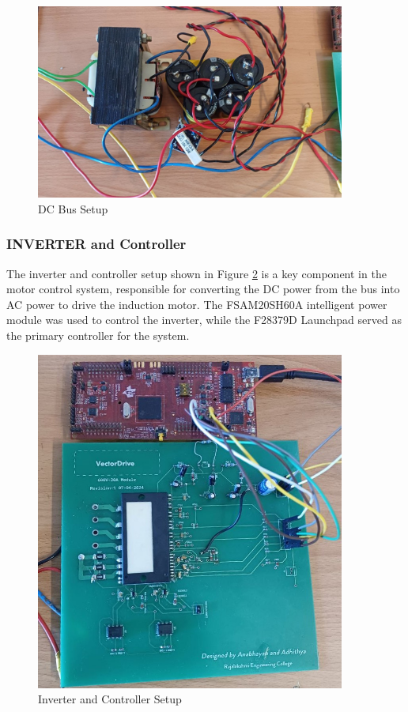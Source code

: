 \begin{figure}[H]
	\centering
	\includegraphics[width=4in]{sections/section6/images/hardwareSetup/DC bus rectifier transformer.jpg}
	\caption{DC Bus Setup}
	\label{fig:DC Bus Setup}
\end{figure}


\subsubsection{INVERTER and Controller}

The inverter and controller setup shown in Figure \ref{fig:Inverter and Controller Setup} is a key component in the motor control system, responsible for converting the DC power from the bus into AC power to drive the induction motor. The FSAM20SH60A intelligent power module was used to control the inverter, while the F28379D Launchpad served as the primary controller for the system.

\begin{figure}[H]
	\centering
	\includegraphics[width=4in]{sections/section6/images/hardwareSetup/IPM and C2000.jpg}
	\caption{Inverter and Controller Setup}
	\label{fig:Inverter and Controller Setup}
\end{figure}

